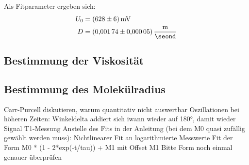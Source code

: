 Als Fitparameter ergeben sich:
\begin{align*}
  U_0 &= \SI{628(6)}{\milli\volt} \\
  D &= \SI{0.00174(5)}{\frac{\meter}{\seond}}
\end{align*}

\subsection{Bestimmung der Viskosität}


\subsection{Bestimmung des Molekülradius}


Carr-Purcell diskutieren, warum quantitativ nicht auswertbar
Oszillationen bei höheren Zeiten: Winkeldelta addiert sich iwann
wieder auf 180°, damit wieder Signal
T1-Messung
Anstelle des Fits in der Anleitung (bei dem M0 quasi zufällig gewählt werden muss):
Nichtlinearer Fit an logarithmierte Messwerte
Fit der Form M0 * (1 - 2*exp(-t/tau)) + M1
mit Offset M1
Bitte Form noch einmal genauer überprüfen


